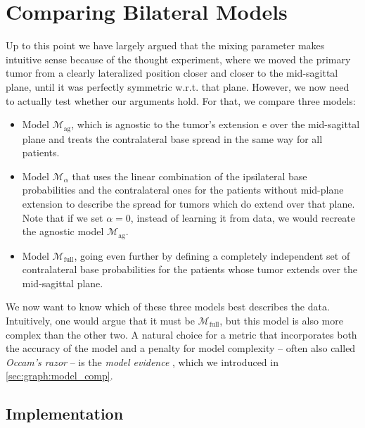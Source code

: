 \documentclass[\relativeRoot/main.tex]{subfiles}
\begin{document}
\section{Comparing Bilateral Models}
\label{sec:bilateral:model_comp}

Up to this point we have largely argued that the mixing parameter makes intuitive sense because of the thought experiment, where we moved the primary tumor from a clearly lateralized position closer and closer to the mid-sagittal plane, until it was perfectly symmetric w.r.t. that plane. However, we now need to actually test whether our arguments hold. For that, we compare three models:

\begin{itemize}
    \item Model $\mathcal{M}_\text{ag}$, which is agnostic to the tumor's extension $\text{e}$ over the mid-sagittal plane and treats the contralateral base spread in the same way for all patients.
    \item Model $\mathcal{M}_\alpha$ that uses the linear combination of the ipsilateral base probabilities and the contralateral ones for the patients without mid-plane extension to describe the spread for tumors which do extend over that plane. Note that if we set $\alpha = 0$, instead of learning it from data, we would recreate the agnostic model $\mathcal{M}_\text{ag}$.
    \item Model $\mathcal{M}_\text{full}$, going even further by defining a completely independent set of contralateral base probabilities for the patients whose tumor extends over the mid-sagittal plane.
\end{itemize}

We now want to know which of these three models best describes the data. Intuitively, one would argue that it must be $\mathcal{M}_\text{full}$, but this model is also more complex than the other two. A natural choice for a metric that incorporates both the accuracy of the model and a penalty for model complexity -- often also called \emph{Occam's razor} -- is the \emph{model evidence} \cite{aponte_introduction_2022}, which we introduced in \cref{sec:graph:model_comp}.

\clearpage

\subsection{Implementation}
\label{subsec:bilateral:model_comp:implementation}
\end{document}
